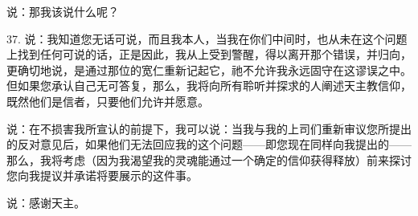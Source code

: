 说：那我该说什么呢？\par

37. 说：我知道您无话可说，而且我本人，当我在你们中间时，也从未在这个问题上找到任何可说的话，正是因此，我从上受到警醒，得以离开那个错误，并归向，更确切地说，是通过那位的宽仁重新记起它，祂不允许我永远固守在这谬误之中。但如果您承认自己无可答复，那么，我将向所有聆听并探求的人阐述天主教信仰，既然他们是信者，只要他们允许并愿意。\par

说：在不损害我所宣认的前提下，我可以说：当我与我的上司们重新审议您所提出的反对意见后，如果他们无法回应我的这个问题——即您现在同样向我提出的——那么，我将考虑（因为我渴望我的灵魂能通过一个确定的信仰获得释放）前来探讨您向我提议并承诺将要展示的这件事。\par

说：感谢天主。\par


